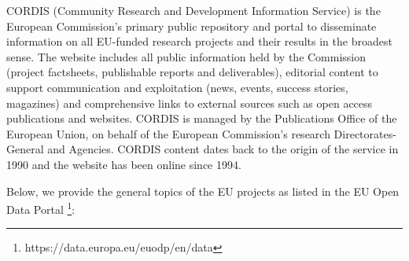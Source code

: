 \documentclass[12pt]{report}
\begin{document}
CORDIS (Community Research and Development Information Service) is the European Commission's primary public repository and portal to disseminate information on all EU-funded research projects and their results in the broadest sense. The website includes all public information held by the Commission (project factsheets, publishable reports and deliverables), editorial content to support communication and exploitation (news, events, success stories, magazines) and comprehensive links to external sources such as open access publications and websites. CORDIS is managed by the Publications Office of the European Union, on behalf of the European Commission's research Directorates-General and Agencies. CORDIS content dates back to the origin of the service in 1990 and the website has been online since 1994.

Below, we provide the general topics of the EU projects as listed in the EU Open Data Portal \footnote{https://data.europa.eu/euodp/en/data}:
\end{document}
